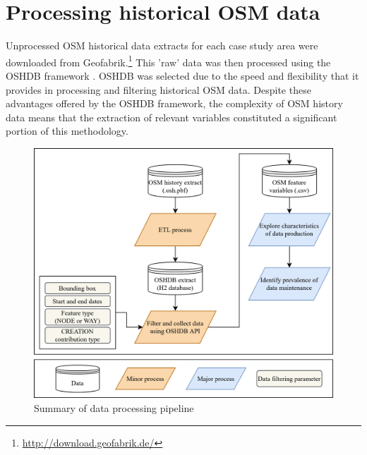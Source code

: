 \section{Processing historical OSM data}
\label{sec:history}

Unprocessed OSM historical data extracts for each case study area were downloaded from Geofabrik.\footnote{\url{http://download.geofabrik.de/}} This 'raw' data was then processed using the OSHDB framework \parencite{raifer_oshdb_2019}. OSHDB was selected due to the speed and flexibility that it provides in processing and filtering historical OSM data. Despite these advantages offered by the OSHDB framework, the complexity of OSM history data means that the extraction of relevant variables constituted a significant portion of this methodology. 

\begin{figure} %
    \centering %
    \includegraphics[width = \textwidth]{Images/Datapipeline.png} %
    \caption{Summary of data processing pipeline} %
    \label{fig:pipe} %
\end{figure}


